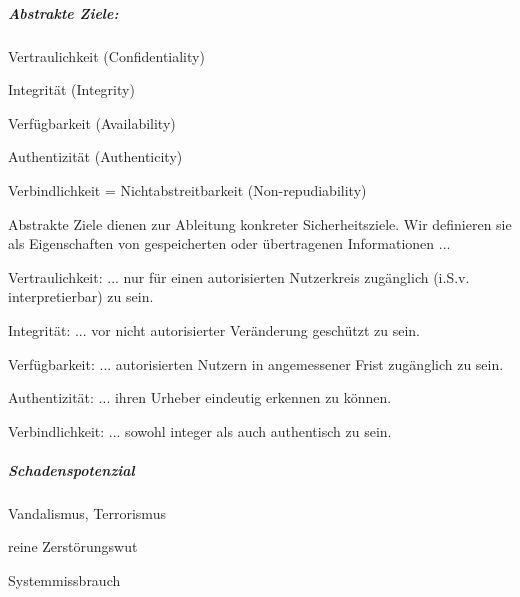 \documentclass[a4paper]{article}
\begin{document}
\begin{multicols}{3}
    \subparagraph{Abstrakte Ziele:}

    \begin{enumerate*}
        \item
        Vertraulichkeit (Confidentiality)
        \item
        Integrität (Integrity)
        \item
        Verfügbarkeit (Availability)
        \item
        Authentizität (Authenticity)
        \item
        Verbindlichkeit = Nichtabstreitbarkeit (Non-repudiability)
    \end{enumerate*}

    Abstrakte Ziele dienen zur Ableitung konkreter Sicherheitsziele. Wir
    definieren sie als Eigenschaften von gespeicherten oder übertragenen
    Informationen ...

    \begin{itemize*}
        \item
        Vertraulichkeit: ... nur für einen autorisierten Nutzerkreis
        zugänglich (i.S.v. interpretierbar) zu sein.
        \item
        Integrität: ... vor nicht autorisierter Veränderung geschützt zu sein.
        \item
        Verfügbarkeit: ... autorisierten Nutzern in angemessener Frist
        zugänglich zu sein.
        \item
        Authentizität: ... ihren Urheber eindeutig erkennen zu können.
        \item
        Verbindlichkeit: ... sowohl integer als auch authentisch zu sein.
    \end{itemize*}


    \subparagraph{Schadenspotenzial}

    \begin{enumerate*}
        \item
        Vandalismus, Terrorismus
    \end{enumerate*}

    \begin{itemize*}
        \item
        reine Zerstörungswut
    \end{itemize*}

    \begin{enumerate*}
        \setcounter{enumi}{1}
        \item
        Systemmissbrauch
    \end{enumerate*}


\end{multicols}
\end{document}
